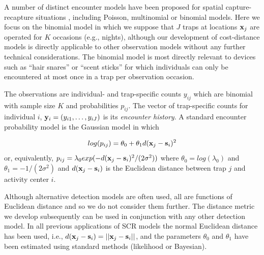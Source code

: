 \documentclass[12pt]{article}
\begin{document}
\begin{spacing}{1.8}

A number of distinct encounter %
models have been proposed for
spatial capture-recapture situations \citep{borchers_efford:2008,
  royle_etal:2009ecol, efford_etal:2009ecol}, including Poisson,
multinomial or binomial %
models.
Here we focus on the binomial model in which we
suppose that $J$ traps at locations ${\bf x}_{j}$ are operated for $K$
occasions (e.g., nights), although our development of cost-distance
models is directly applicable to other observation models without any
further technical considerations. The binomial model is most directly
relevant to devices such as ``hair snares''
\citep{woods_etal:1999,gardner_etal:2010jwm} or ``scent sticks''
\citep{kery_etal:2010} for which individuals can only be encountered
at most once in a trap per observation occasion.

The observations are individual- and trap-specific counts $y_{ij}$
which are binomial with sample size $K$ and probabilities
$p_{ij}$. The vector of trap-specific counts for individual $i$,
 ${\bf y}_{i} = (y_{i1},\ldots,y_{iJ})$ is its {\it encounter history}.
A standard encounter probability model
\citep{borchers_efford:2008} is the Gaussian model in which

\begin{equation}
log(p_{ij})= \theta_{0} + \theta_{1} d({\bf x}_{j} - {\bf s}_{i})^{2}
\label{eq.encounter}
\end{equation}
or, equivalently,
$p_{ij} = \lambda_{0} exp(-  d({\bf x}_{j} - {\bf s}_{i})^{2}
/(2\sigma^{2}) )$
where $\theta_{0} = log(\lambda_{0})$ and $\theta_{1} =
-1/(2\sigma^2)$ and $d({\bf x}_{j} - {\bf s}_{i})$ is the Euclidean
distance between trap $j$ and activity center $i$.


Although alternative detection models are often used, all are
functions of Euclidean distance and so we do not consider them
further. The distance metric we develop subsequently can be
used in conjunction with any other detection model.  In all previous
applications of SCR models the normal Euclidean distance has been
used, i.e., $ d({\bf x}_{j} - {\bf s}_{i}) = ||{\bf x}_{j} - {\bf
  s}_{i}||$, and the parameters $\theta_0$ and $\theta_1$ have been
estimated using standard methods (likelihood or Bayesian).


\end{spacing}
\end{document}
